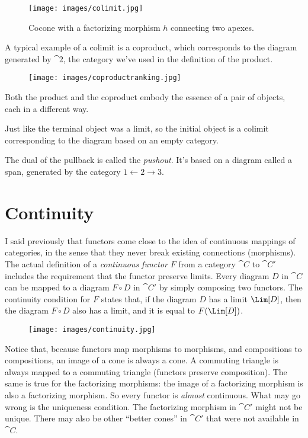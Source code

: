 \begin{figure}[H]
\centering
\texttt{[image: images/colimit.jpg]}
\caption{Cocone with a factorizing morphism $h$ connecting two apexes.}
\end{figure}

\noindent
A typical example of a colimit is a coproduct, which corresponds to the
diagram generated by $\cat{2}$, the category we've used in the
definition of the product.

\begin{figure}[H]
\centering
\texttt{[image: images/coproductranking.jpg]}
\end{figure}

\noindent
Both the product and the coproduct embody the essence of a pair of
objects, each in a different way.

Just like the terminal object was a limit, so the initial object is a
colimit corresponding to the diagram based on an empty category.

The dual of the pullback is called the \emph{pushout}. It's based on a
diagram called a span, generated by the category
$1\leftarrow2\rightarrow3$.

\section{Continuity}\label{continuity}

I said previously that functors come close to the idea of continuous
mappings of categories, in the sense that they never break existing
connections (morphisms). The actual definition of a \emph{continuous
functor} $F$ from a category $\cat{C}$ to $\cat{C\prime}$ includes the
requirement that the functor preserve limits. Every diagram $D$
in $\cat{C}$ can be mapped to a diagram $F \circ D$ in $\cat{C\prime}$ by
simply composing two functors. The continuity condition for $F$
states that, if the diagram $D$ has a limit $\Lim[D]$, then
the diagram $F \circ D$ also has a limit, and it is equal to
$F (\Lim[D])$.

\begin{figure}[H]
\centering
\texttt{[image: images/continuity.jpg]}
\end{figure}

\noindent
Notice that, because functors map morphisms to morphisms, and
compositions to compositions, an image of a cone is always a cone. A
commuting triangle is always mapped to a commuting triangle (functors
preserve composition). The same is true for the factorizing morphisms:
the image of a factorizing morphism is also a factorizing morphism. So
every functor is \emph{almost} continuous. What may go wrong is the
uniqueness condition. The factorizing morphism in $\cat{C\prime}$ might not be
unique. There may also be other ``better cones'' in $\cat{C\prime}$ that were
not available in $\cat{C}$.

